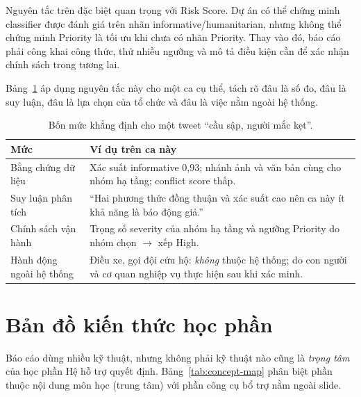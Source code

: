 \enlargethispage{3\baselineskip}
Nguyên tắc trên đặc biệt quan trọng với Risk Score. Dự án có thể chứng minh
classifier được đánh giá trên nhãn informative/humanitarian, nhưng không thể
chứng minh Priority là tối ưu khi chưa có nhãn Priority. Thay vào đó, báo cáo
phải công khai công thức, thử nhiều ngưỡng và mô tả điều kiện cần để xác nhận
chính sách trong tương lai.

Bảng~\ref{tab:evidence-policy} áp dụng nguyên tắc này cho một ca cụ thể, tách
rõ đâu là số đo, đâu là suy luận, đâu là lựa chọn của tổ chức và đâu là việc
nằm ngoài hệ thống.

\begin{table}[H]
\centering
\small
\caption{Bốn mức khẳng định cho một tweet ``cầu sập, người mắc kẹt''.}
\label{tab:evidence-policy}
\begin{tabularx}{\textwidth}{p{3.4cm}X}
\toprule
\textbf{Mức} & \textbf{Ví dụ trên ca này}\\
\midrule
Bằng chứng dữ liệu & Xác suất informative 0,93; nhánh ảnh và văn bản cùng cho
nhóm hạ tầng; conflict score thấp.\\
Suy luận phân tích & ``Hai phương thức đồng thuận và xác suất cao nên ca này ít
khả năng là báo động giả.''\\
Chính sách vận hành & Trọng số severity của nhóm hạ tầng và ngưỡng Priority do
nhóm chọn $\rightarrow$ xếp High.\\
Hành động ngoài hệ thống & Điều xe, gọi đội cứu hộ: \emph{không} thuộc hệ thống;
do con người và cơ quan nghiệp vụ thực hiện sau khi xác minh.\\
\bottomrule
\end{tabularx}
\end{table}

\section{Bản đồ kiến thức học phần}
\label{sec:concept-map}

Báo cáo dùng nhiều kỹ thuật, nhưng không phải kỹ thuật nào cũng là \emph{trọng
tâm} của học phần Hệ hỗ trợ quyết định. Bảng~\ref{tab:concept-map} phân biệt
phần thuộc nội dung môn học (trung tâm) với phần công cụ bổ trợ nằm ngoài slide.

